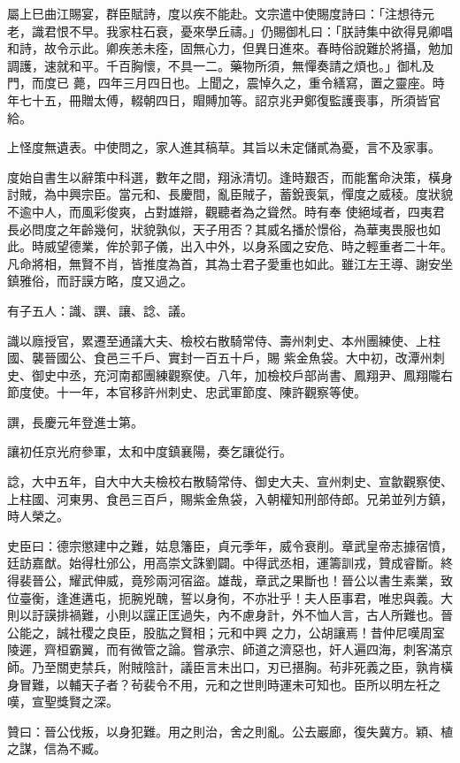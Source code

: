 \begin{pinyinscope}
 屬上巳曲江賜宴，群臣賦詩，度以疾不能赴。文宗遣中使賜度詩曰：「注想待元老，識君恨不早。我家柱石衰，憂來學丘禱。」仍賜御札曰：「朕詩集中欲得見卿唱和詩，故令示此。卿疾恙未痊，固無心力，但異日進來。春時俗說難於將攝，勉加調護，速就和平。千百胸懷，不具一二。藥物所須，無憚奏請之煩也。」御札及門，而度已
 薨，四年三月四日也。上聞之，震悼久之，重令繕寫，置之靈座。時年七十五，冊贈太傅，輟朝四日，賵賻加等。詔京兆尹鄭復監護喪事，所須皆官給。



 上怪度無遺表。中使問之，家人進其稿草。其旨以未定儲貳為憂，言不及家事。



 度始自書生以辭策中科選，數年之間，翔泳清切。逢時艱否，而能奮命決策，橫身討賊，為中興宗臣。當元和、長慶間，亂臣賊子，蓄銳喪氣，憚度之威稜。度狀貌不逾中人，而風彩俊爽，占對雄辯，觀聽者為之聳然。時有奉
 使絕域者，四夷君長必問度之年齡幾何，狀貌孰似，天子用否？其威名播於憬俗，為華夷畏服也如此。時威望德業，侔於郭子儀，出入中外，以身系國之安危、時之輕重者二十年。凡命將相，無賢不肖，皆推度為首，其為士君子愛重也如此。雖江左王導、謝安坐鎮雅俗，而訏謨方略，度又過之。



 有子五人：識、譔、讓、諗、議。



 識以廕授官，累遷至通議大夫、檢校右散騎常侍、壽州刺史、本州團練使、上柱國、襲晉國公、食邑三千戶、實封一百五十戶，賜
 紫金魚袋。大中初，改潭州刺史、御史中丞，充河南都團練觀察使。八年，加檢校戶部尚書、鳳翔尹、鳳翔隴右節度使。十一年，本官移許州刺史、忠武軍節度、陳許觀察等使。



 譔，長慶元年登進士第。



 讓初任京光府參軍，太和中度鎮襄陽，奏乞讓從行。



 諗，大中五年，自大中大夫檢校右散騎常侍、御史大夫、宣州刺史、宣歙觀察使、上柱國、河東男、食邑三百戶，賜紫金魚袋，入朝權知刑部侍郎。兄弟並列方鎮，時人榮之。



 史臣曰：德宗懲建中之難，姑息籓臣，貞元季年，威令衰削。章武皇帝志據宿憤，廷訪嘉猷。始得杜邠公，用高崇文誅劉闢。中得武丞相，運籌訓戎，贊成睿斷。終得裴晉公，耀武伸威，竟殄兩河宿盜。雄哉，章武之果斷也！晉公以書生素業，致位臺衡，逢進遘屯，扼腕兇醜，誓以身徇，不亦壯乎！夫人臣事君，唯忠與義。大則以訏謨排禍難，小則以讜正匡過失，內不慮身計，外不恤人言，古人所難也。晉公能之，誠社稷之良臣，股肱之賢相；元和中興
 之力，公胡讓焉！昔仲尼嘆周室陵遲，齊桓霸翼，而有微管之論。嘗承宗、師道之濟惡也，奸人遍四海，刺客滿京師。乃至關吏禁兵，附賊陰計，議臣言未出口，刃已揕胸。茍非死義之臣，孰肯橫身冒難，以輔天子者？茍裴令不用，元和之世則時運未可知也。臣所以明左衽之嘆，宣聖獎賢之深。



 贊曰：晉公伐叛，以身犯難。用之則治，舍之則亂。公去巖廊，復失冀方。穎、植之謀，信為不臧。



\end{pinyinscope}